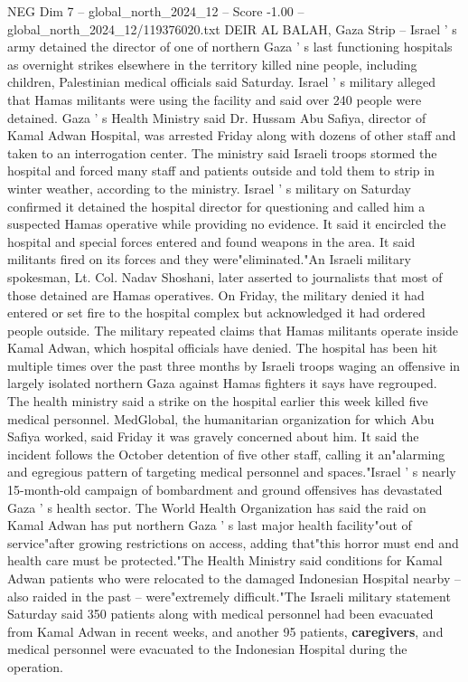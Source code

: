 \begin{textsample}{NEG Dim 7 – global\_north\_2024\_12 – Score -1.00 – global\_north\_2024\_12/119376020.txt}  \label{ex:f7_neg_164}
DEIR AL BALAH, Gaza Strip -- Israel ' s army detained the director of one of northern Gaza ' s last functioning hospitals as overnight strikes elsewhere in the territory killed nine people, including children, Palestinian medical officials said Saturday.
Israel ' s military alleged that Hamas militants were using the facility and said over 240 people were detained.
Gaza ' s Health Ministry said Dr.
Hussam Abu Safiya, director of Kamal Adwan Hospital, was arrested Friday along with dozens of other staff and taken to an interrogation center.
The ministry said Israeli troops stormed the hospital and forced many staff and patients outside and told them to strip in winter weather, according to the ministry.
Israel ' s military on Saturday confirmed it detained the hospital director for questioning and called him a suspected Hamas operative while providing no evidence.
It said it encircled the hospital and special forces entered and found weapons in the area.
It said militants fired on its forces and they were"eliminated."An Israeli military spokesman, Lt.
Col.
Nadav Shoshani, later asserted to journalists that most of those detained are Hamas operatives.
On Friday, the military denied it had entered or set fire to the hospital complex but acknowledged it had ordered people outside.
The military repeated claims that Hamas militants operate inside Kamal Adwan, which hospital officials have denied.
The hospital has been hit multiple times over the past three months by Israeli troops waging an offensive in largely isolated northern Gaza against Hamas fighters it says have regrouped.
The health ministry said a strike on the hospital earlier this week killed five medical personnel.
MedGlobal, the humanitarian organization for which Abu Safiya worked, said Friday it was gravely concerned about him.
It said the incident follows the October detention of five other staff, calling it an"alarming and egregious pattern of targeting medical personnel and spaces."Israel ' s nearly 15-month-old campaign of bombardment and ground offensives has devastated Gaza ' s health sector.
The World Health Organization has said the raid on Kamal Adwan has put northern Gaza ' s last major health facility"out of service"after growing restrictions on access, adding that"this horror must end and health care must be protected."The Health Ministry said conditions for Kamal Adwan patients who were relocated to the damaged Indonesian Hospital nearby -- also raided in the past -- were"extremely difficult."The Israeli military statement Saturday said 350 patients along with medical personnel had been evacuated from Kamal Adwan in recent weeks, and another 95 patients, \textbf{caregivers}, and medical personnel were evacuated to the Indonesian Hospital during the operation.

\end{textsample}
